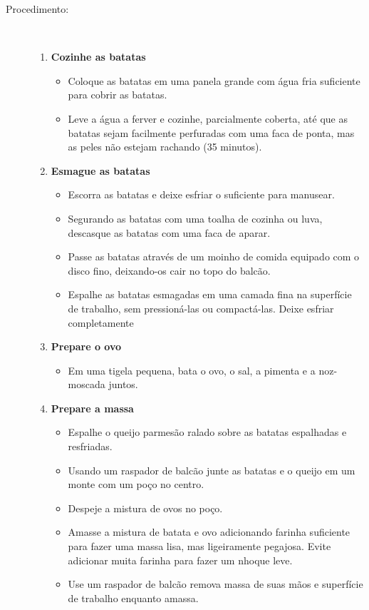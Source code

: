 \documentclass [11pt, letterpaper] {article}
\begin{document}
\begin {description}
\item [Procedimento:] \ \\
\begin {enumerate}
\item {\bf Cozinhe as batatas}
	\begin {itemize}
	\item Coloque as batatas em uma panela grande com água fria suficiente para cobrir as batatas.
        \item Leve a água a ferver e cozinhe, parcialmente coberta, até que as batatas sejam facilmente perfuradas com uma faca de ponta, mas as peles não estejam rachando (35 minutos).
\end {itemize}
\item {\bf Esmague as batatas}
	\begin {itemize}
	\item Escorra as batatas e deixe esfriar o suficiente para manusear.
	\item Segurando as batatas com uma toalha de cozinha ou luva, descasque as batatas com uma faca de aparar.
	\item Passe as batatas através de um moinho de comida equipado com o disco fino, deixando-os cair no topo do balcão.
	\item Espalhe as batatas esmagadas em uma camada fina na superfície de trabalho, sem pressioná-las ou compactá-las. Deixe esfriar completamente
	\end {itemize}
\item {\bf Prepare o ovo}
\begin {itemize}
\item Em uma tigela pequena, bata o ovo, o sal, a pimenta e a noz-moscada juntos.
\end {itemize}
\item {\bf Prepare a massa}
\begin {itemize}
\item Espalhe o queijo parmesão ralado sobre as batatas espalhadas e resfriadas.
\item Usando um raspador de balc\~ao junte as batatas e o queijo em um monte com um poço no centro.
\item Despeje a mistura de ovos no poço.
\item Amasse a mistura de batata e ovo adicionando farinha suficiente para fazer uma massa lisa, mas ligeiramente pegajosa. Evite adicionar muita farinha para fazer um nhoque leve.
\item Use um raspador de balc\~ao remova massa de suas mãos e superfície de trabalho enquanto amassa.
\end {itemize}


\end{enumerate}
\end{description}
\end{document}
